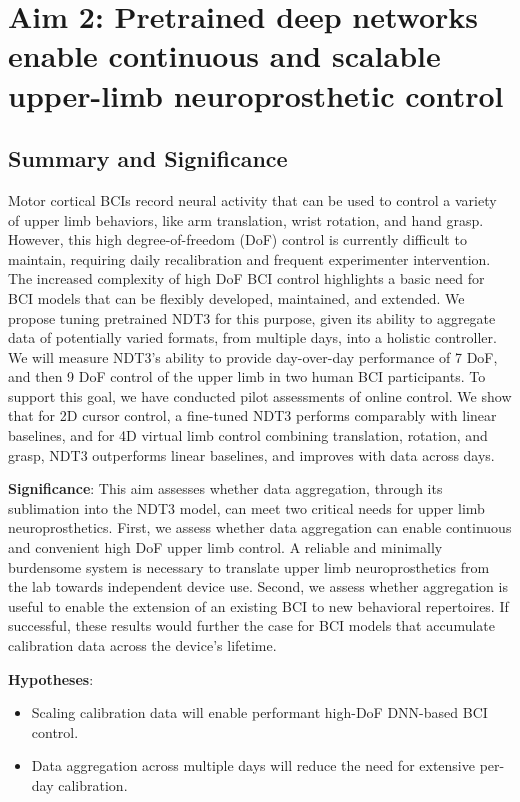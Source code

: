 \documentclass[12pt,oneside]{report}
\begin{document}
\chapter{Aim 2: Pretrained deep networks enable continuous and scalable upper-limb neuroprosthetic control}

\section{Summary and Significance}
Motor cortical BCIs record neural activity that can be used to control a variety of upper limb behaviors, like arm translation, wrist rotation, and hand grasp.
However, this high degree-of-freedom (DoF) control is currently difficult to maintain, requiring daily recalibration and frequent experimenter intervention.
The increased complexity of high DoF BCI control highlights a basic need for BCI models that can be flexibly developed, maintained, and extended.
We propose tuning pretrained NDT3 for this purpose, given its ability to aggregate data of potentially varied formats, from multiple days, into a holistic controller. We will measure NDT3's ability to provide day-over-day performance of 7 DoF, and then 9 DoF control of the upper limb in two human BCI participants. To support this goal, we have conducted pilot assessments of online control. We show that for 2D cursor control, a fine-tuned NDT3 performs comparably with linear baselines, and for 4D virtual limb control combining translation, rotation, and grasp, NDT3 outperforms linear baselines, and improves with data across days.

\textbf{Significance}: This aim assesses whether data aggregation, through its sublimation into the NDT3 model, can meet two critical needs for upper limb neuroprosthetics. First, we assess whether data aggregation can enable continuous and convenient high DoF upper limb control. A reliable and minimally burdensome system is necessary to translate upper limb neuroprosthetics from the lab towards independent device use. Second, we assess whether aggregation is useful to enable the extension of an existing BCI to new behavioral repertoires. If successful, these results would further the case for BCI models that accumulate calibration data across the device's lifetime.

\textbf{Hypotheses}:
\begin{itemize}
  \item Scaling calibration data will enable performant high-DoF DNN-based BCI control. %
  \item Data aggregation across multiple days will reduce the need for extensive per-day calibration.
\end{itemize}
\end{document}
